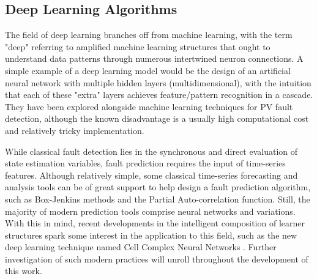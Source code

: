 \subsection{Deep Learning Algorithms}

The field of deep learning branches off from machine learning, with the term "deep" referring to amplified machine learning structures that ought to understand data patterns through numerous intertwined neuron connections. A simple example of a deep learning model would be the design of an artificial neural network with multiple hidden layers (multidimensional), with the intuition that each of these "extra" layers achieves feature/pattern recognition in a cascade. They have been explored alongside machine learning techniques for PV fault detection, although the known disadvantage is a usually high computational cost and relatively tricky implementation.


While classical fault detection lies in the synchronous and direct evaluation of state estimation variables, fault prediction requires the input of time-series features. Although relatively simple, some classical time-series forecasting and analysis tools can be of great support to help design a fault prediction algorithm, such as Box-Jenkins methods and the Partial Auto-correlation function. Still, the majority of modern prediction tools comprise neural networks and variations. With this in mind, recent developments in the intelligent composition of learner structures spark some interest in the application to this field, such as the new deep learning technique named Cell Complex Neural Networks \cite{Hajij2020}. Further investigation of such modern practices will unroll throughout the development of this work.

